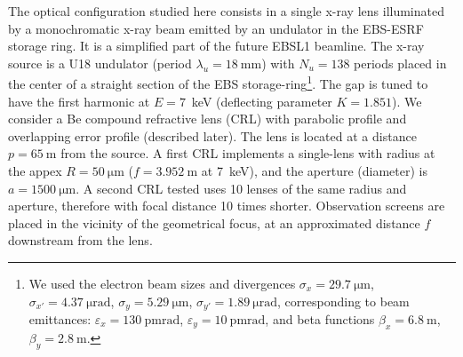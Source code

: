 \documentclass[preprint]{iucr}
\begin{document}
The optical configuration studied here consists in a single x-ray lens illuminated by a monochromatic x-ray beam emitted by an undulator in the EBS-ESRF storage ring. It is a simplified part of the future EBSL1 beamline.
The x-ray source is a U18 undulator (period $\lambda_u=\SI{18}{\milli\meter}$) with $N_u=138$ periods placed in the center of a straight section of the EBS storage-ring\footnote{We used the electron beam sizes and divergences $\sigma_x=\SI{29.7}{\micro\meter}$,
$\sigma_{x'}=\SI{4.37}{\micro\radian}$,
$\sigma_y=\SI{5.29}{\micro\meter}$,
$\sigma_{y'}=\SI{1.89}{\micro\radian}$, corresponding to beam emittances:  $\varepsilon_x=\SI{130}{\pico\meter \radian}$,
$\varepsilon_y=\SI{10}{\pico\meter \radian}$, and beta functions
$\beta_x=\SI{6.8}{\meter}$,
$\beta_y=\SI{2.8}{\meter}$.
}. The gap is tuned to have the first harmonic at $E=7$~keV (deflecting parameter $K=1.851$). We consider a Be compound refractive lens (CRL) with parabolic profile and overlapping error profile (described later). The lens is located at a distance $p=\SI{65}{\meter}$ from the source. 
A first CRL implements a single-lens with radius at the appex $R=\SI{50}{\micro\meter}$ ($f=\SI{3.952}{\meter}$ at 7~keV), 
 and the aperture (diameter) is $a=\SI{1500}{\micro\meter}$. A second CRL tested uses 10 lenses of the same radius and aperture, therefore with focal distance 10 times shorter.
 Observation screens are placed in the vicinity of the geometrical focus, at an approximated distance $f$ downstream from the lens. 
\end{document}

